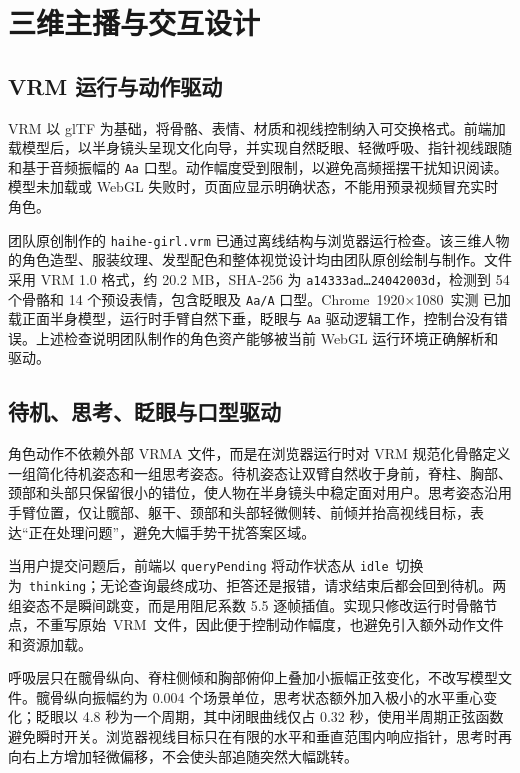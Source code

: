 \documentclass[UTF8,zihao=-4,fontset=none,twoside]{ctexart}
\newcommand{\code}[1]{\mbox{\texttt{#1}}\nobreak}
\begin{document}
\section{三维主播与交互设计}

\subsection{VRM 运行与动作驱动}

VRM 以 glTF 为基础，将骨骼、表情、材质和视线控制纳入可交换格式\cite{vrmspec,vroidexport}。前端加载模型后，以半身镜头呈现文化向导，并实现自然眨眼、轻微呼吸、指针视线跟随和基于音频振幅的 \code{Aa} 口型。动作幅度受到限制，以避免高频摇摆干扰知识阅读。模型未加载或 WebGL 失败时，页面应显示明确状态，不能用预录视频冒充实时角色。

团队原创制作的 \code{haihe-girl.vrm} 已通过离线结构与浏览器运行检查。该三维人物的角色造型、服装纹理、发型配色和整体视觉设计均由团队原创绘制与制作。文件采用 VRM 1.0 格式，约 20.2 MB，SHA-256 为 \code{a14333ad\ldots24042003d}，检测到 54 个骨骼和 14 个预设表情，包含眨眼及 \code{Aa/A} 口型。\mbox{Chrome 1920×1080 实测} 已加载正面半身模型，运行时手臂自然下垂，眨眼与 \code{Aa} 驱动逻辑工作，控制台没有错误。上述检查说明团队制作的角色资产能够被当前 WebGL 运行环境正确解析和驱动。

\subsection{待机、思考、眨眼与口型驱动}

角色动作不依赖外部 VRMA 文件，而是在浏览器运行时对 VRM 规范化骨骼定义一组简化待机姿态和一组思考姿态。待机姿态让双臂自然收于身前，脊柱、胸部、颈部和头部只保留很小的错位，使人物在半身镜头中稳定面对用户。思考姿态沿用手臂位置，仅让髋部、躯干、颈部和头部轻微侧转、前倾并抬高视线目标，表达“正在处理问题”，避免大幅手势干扰答案区域。

当用户提交问题后，前端以 \code{queryPending} 将动作状态从 \mbox{\code{idle} 切换为 \code{thinking}}；无论查询最终成功、拒答还是报错，请求结束后都会回到待机。两组姿态不是瞬间跳变，而是用阻尼系数 5.5 逐帧插值。实现只修改运行时骨骼节点，不重写\mbox{原始 VRM 文件}，因此便于控制动作幅度，也避免引入额外动作文件和资源加载。

呼吸层只在髋骨纵向、脊柱侧倾和胸部俯仰上叠加小振幅正弦变化，不改写模型文件。髋骨纵向振幅约为 0.004 个场景单位，思考状态额外加入极小的水平重心变化；眨眼以 4.8 秒为一个周期，其中闭眼曲线仅占 0.32 秒，使用半周期正弦函数避免瞬时开关。浏览器视线目标只在有限的水平和垂直范围内响应指针，思考时再向右上方增加轻微偏移，不会使头部追随突然大幅跳转。
\end{document}
